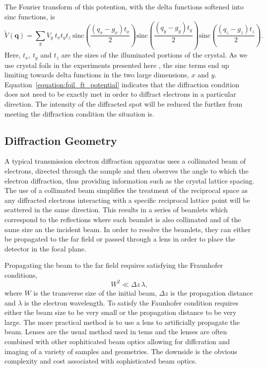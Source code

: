 The Fourier transform of this potention, with the delta functions softened into sinc functions, is
\begin{equation}\label{equation:foil_ft_potential}
\tilde{V}(\mathbf{q}) = \sum_g V_g \: t_x  t_y  t_z \: \text{sinc}{\left( \frac{(q_x-g_x)t_x}{2} \right)} \text{sinc}{\left( \frac{(q_y-g_y)t_y}{2} \right)} \text{sinc}{\left( \frac{(q_z-g_z)t_z}{2} \right)}.
\end{equation}
Here, $t_x$, $t_y$ and $t_z$ are the sizes of the illuminated portions of the crystal.
As we use crystal foils in the experiments presented here , the sinc terms end up limiting towards delta functions in the two large dimensions, $x$ and $y$.
Equation~\ref{equation:foil_ft_potential} indicates that the diffraction condition does not need to be exactly met in order to diffract electrons in a particular direction.
The intensity of the diffracted spot will be reduced the further from meeting the diffraction condition the situation is.

\subsection{Diffraction Geometry}

A typical transmission electron diffraction apparatus uses a collimated beam of electrons, directed through the sample and then observes the angle to which the electron diffraction, thus providing information such as the crystal lattice spacing.
The use of a collimated beam simplifies the treatment of the reciprocal space as any diffracted electrons interacting with a specific reciprocal lattice point will be scattered in the same direction.
This results in a series of beamlets which correspond to the reflections where each beamlet is also collimated and of the same size an the incident beam.
In order to resolve the beamlets, they can either be propagated to the far field or passed through a lens in order to place the detector in the focal plane.

Propagating the beam to the far field requires satisfying the Fraunhofer conditions,
\begin{equation}
W^2 \ll \Delta z\,\lambda,
\end{equation}
where $W$ is the transverse size of the initial beam, $\Delta z$ is the propagation distance and $\lambda$ is the electron wavelength.
To satisfy the Faunhofer condition requires either the beam size to be very small or the propagation distance to be very large.
The more practical method is to use a lens to artificially propagate the beam.
Lenses are the usual method used in \glspl{tem} and the lenses are often combined with other sophiticated beam optics allowing for diffcration and imaging of a variety of samples and geometries.
The downside is the obvious complexity and cost associated with sophisticated beam optics.

